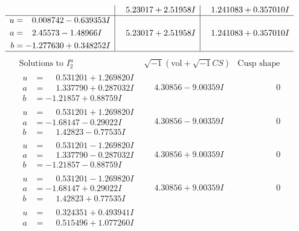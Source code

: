 \documentclass[1p]{elsarticle_modified}
\theoremstyle{definition}
\newcommand{\I}{\sqrt{-1}}
\begin{document}
$$\begin{array}{c|c|c}
 & \phantom{-}5.23017 + 2.51958 I & \phantom{-}1.241083 + 0.357010 I \\ \hline\begin{aligned}
u &= \phantom{-}0.008742 - 0.639353 I \\
a &= \phantom{-}2.45573 - 1.48966 I \\
b &= -1.277630 + 0.348252 I\end{aligned}
 & \phantom{-}5.23017 + 2.51958 I & \phantom{-}1.241083 + 0.357010 I\\
 \hline 
 \end{array}$$\newpage$$\begin{array}{c|c|c}  
\text{Solutions to }I^u_{2}& \I (\text{vol} + \sqrt{-1}CS) & \text{Cusp shape}\\
 \hline 
\begin{aligned}
u &= \phantom{-}0.531201 + 1.269820 I \\
a &= \phantom{-}1.337790 + 0.287032 I \\
b &= -1.21857 + 0.88759 I\end{aligned}
 & \phantom{-}4.30856 - 9.00359 I & \phantom{-0.000000 } 0 \\ \hline\begin{aligned}
u &= \phantom{-}0.531201 + 1.269820 I \\
a &= -1.68147 - 0.29022 I \\
b &= \phantom{-}1.42823 - 0.77535 I\end{aligned}
 & \phantom{-}4.30856 - 9.00359 I & \phantom{-0.000000 } 0 \\ \hline\begin{aligned}
u &= \phantom{-}0.531201 - 1.269820 I \\
a &= \phantom{-}1.337790 - 0.287032 I \\
b &= -1.21857 - 0.88759 I\end{aligned}
 & \phantom{-}4.30856 + 9.00359 I & \phantom{-0.000000 } 0 \\ \hline\begin{aligned}
u &= \phantom{-}0.531201 - 1.269820 I \\
a &= -1.68147 + 0.29022 I \\
b &= \phantom{-}1.42823 + 0.77535 I\end{aligned}
 & \phantom{-}4.30856 + 9.00359 I & \phantom{-0.000000 } 0 \\ \hline\begin{aligned}
u &= \phantom{-}0.324351 + 0.493941 I \\
a &= \phantom{-}0.515496 + 1.077260 I \\

\end{aligned}
\end{array}$$
\end{document}
